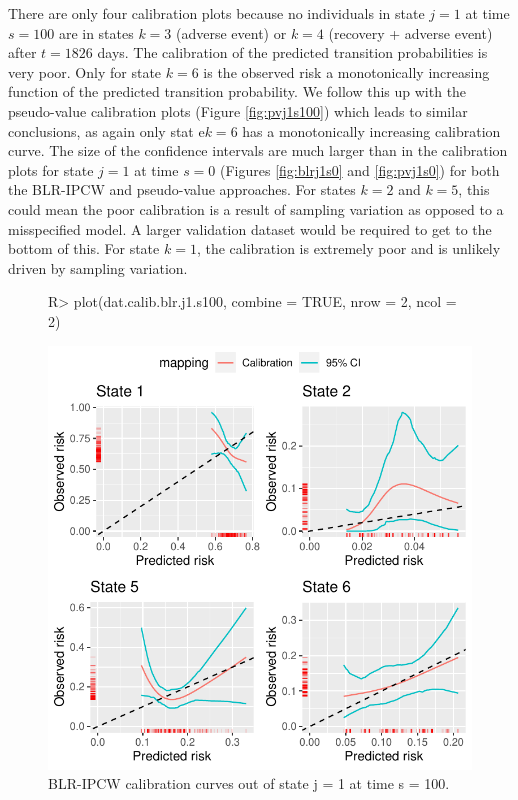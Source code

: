 \documentclass[article,shortnames]{jss}
\begin{document}
There are only four calibration plots because no individuals in state $j = 1$ at time $s = 100$ are in states $k = 3$ (adverse event) or $k = 4$ (recovery + adverse event) after $t = 1826$ days. The calibration of the predicted transition probabilities is very poor. Only for state $k = 6$ is the observed risk a monotonically increasing function of the predicted transition probability. We follow this up with the pseudo-value calibration plots (Figure \ref{fig:pvj1s100}) which leads to similar conclusions, as again only stat e$k = 6$ has a monotonically increasing calibration curve. The size of the confidence intervals are much larger than in the calibration plots for state $j = 1$ at time $s = 0$ (Figures \ref{fig:blrj1s0} and \ref{fig:pvj1s0}) for both the BLR-IPCW and pseudo-value approaches. For states $k = 2$ and $k = 5$, this could mean the poor calibration is a result of sampling variation as opposed to a misspecified model. A larger validation dataset would be required to get to the bottom of this. For state $k = 1$, the calibration is extremely poor and is unlikely driven by sampling variation.

\begin{figure}
\centering
\begin{Schunk}
\begin{Sinput}
R> plot(dat.calib.blr.j1.s100, combine = TRUE, nrow = 2, ncol = 2)
\end{Sinput}
\end{Schunk}
\includegraphics{calibmsm-jss-20230613-012}
\caption{\label{fig:blrj1s100} BLR-IPCW calibration curves out of state j =  1 at time s = 100.}
\end{figure}
\end{document}
